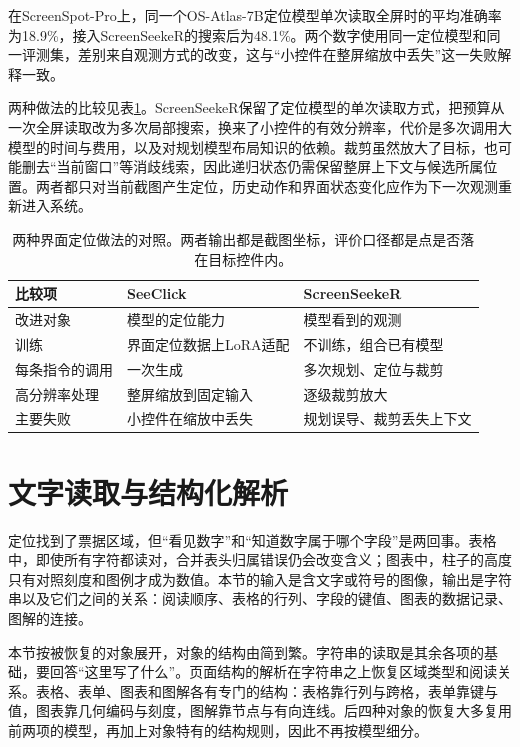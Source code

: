 在ScreenSpot-Pro上，同一个OS-Atlas-7B定位模型单次读取全屏时的平均准确率为18.9\%，接入ScreenSeekeR的搜索后为48.1\%。两个数字使用同一定位模型和同一评测集，差别来自观测方式的改变，这与“小控件在整屏缩放中丢失”这一失败解释一致。

两种做法的比较见表\ref{tab:vision-understanding-gui-compare}。ScreenSeekeR保留了定位模型的单次读取方式，把预算从一次全屏读取改为多次局部搜索，换来了小控件的有效分辨率，代价是多次调用大模型的时间与费用，以及对规划模型布局知识的依赖。裁剪虽然放大了目标，也可能删去“当前窗口”等消歧线索，因此递归状态仍需保留整屏上下文与候选所属位置。两者都只对当前截图产生定位，历史动作和界面状态变化应作为下一次观测重新进入系统。

\begin{table}[htbp]
  \centering
  \small
  \begin{tabularx}{\linewidth}{@{}p{16mm}XX@{}}
    \toprule
    比较项 & SeeClick & ScreenSeekeR\\
    \midrule
    改进对象 & 模型的定位能力 & 模型看到的观测\\
    训练 & 界面定位数据上LoRA适配 & 不训练，组合已有模型\\
    每条指令的调用 & 一次生成 & 多次规划、定位与裁剪\\
    高分辨率处理 & 整屏缩放到固定输入 & 逐级裁剪放大\\
    主要失败 & 小控件在缩放中丢失 & 规划误导、裁剪丢失上下文\\
    \bottomrule
  \end{tabularx}
  \caption{两种界面定位做法的对照。两者输出都是截图坐标，评价口径都是点是否落在目标控件内。}
  \label{tab:vision-understanding-gui-compare}
\end{table}

\section{文字读取与结构化解析}
\label{sec:vision-understanding-reading}

定位找到了票据区域，但“看见数字”和“知道数字属于哪个字段”是两回事。表格中，即使所有字符都读对，合并表头归属错误仍会改变含义；图表中，柱子的高度只有对照刻度和图例才成为数值。本节的输入是含文字或符号的图像，输出是字符串以及它们之间的关系：阅读顺序、表格的行列、字段的键值、图表的数据记录、图解的连接。

本节按被恢复的对象展开，对象的结构由简到繁。字符串的读取是其余各项的基础，要回答“这里写了什么”。页面结构的解析在字符串之上恢复区域类型和阅读关系。表格、表单、图表和图解各有专门的结构：表格靠行列与跨格，表单靠键与值，图表靠几何编码与刻度，图解靠节点与有向连线。后四种对象的恢复大多复用前两项的模型，再加上对象特有的结构规则，因此不再按模型细分。

